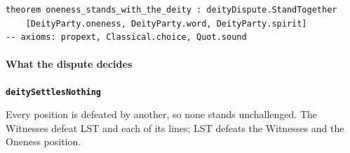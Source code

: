 \documentclass[11pt,paper=\testimonypaper,DIV=13,parskip=false]{scrartcl}
\begin{document}
{\small\begin{verbatim}
theorem oneness_stands_with_the_deity : deityDispute.StandTogether
    [DeityParty.oneness, DeityParty.word, DeityParty.spirit]
-- axioms: propext, Classical.choice, Quot.sound
\end{verbatim}}
\paragraph*{What the dispute decides}
\leavevmode\par\nobreak
\par\medskip\noindent\textbf{\texttt{deity\allowbreak{}Settles\allowbreak{}Nothing}}\par\nobreak\noindent
Every position is defeated by another, so none stands unchallenged. The Witnesses defeat LST and each of its lines; LST defeats the Witnesses and the Oneness position.
\end{document}
